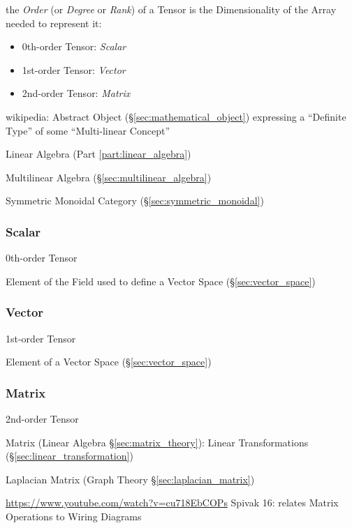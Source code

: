 {{the \emph{Order} (or \emph{Degree} or \emph{Rank}) of a Tensor is the
Dimensionality of the Array needed to represent it:

\begin{itemize}
  \item 0th-order Tensor: \emph{Scalar}
  \item 1st-order Tensor: \emph{Vector}
  \item 2nd-order Tensor: \emph{Matrix}
\end{itemize}

wikipedia: Abstract Object (\S\ref{sec:mathematical_object})
expressing a ``Definite Type'' of some ``Multi-linear Concept''

Linear Algebra (Part \ref{part:linear_algebra})

Multilinear Algebra (\S\ref{sec:multilinear_algebra})

Symmetric Monoidal Category (\S\ref{sec:symmetric_monoidal})



\subsubsection{Scalar}\label{sec:scalar}

0th-order Tensor

Element of the Field used to define a Vector Space
(\S\ref{sec:vector_space})



\subsubsection{Vector}\label{sec:vector}

1st-order Tensor

Element of a Vector Space (\S\ref{sec:vector_space})



\subsubsection{Matrix}\label{sec:matrix}

2nd-order Tensor

Matrix (Linear Algebra \S\ref{sec:matrix_theory}):
Linear Transformations (\S\ref{sec:linear_transformation})

Laplacian Matrix (Graph Theory \S\ref{sec:laplacian_matrix})

\url{https://www.youtube.com/watch?v=cu718EbCOPs} Spivak 16: relates
Matrix Operations to Wiring Diagrams %

}}
